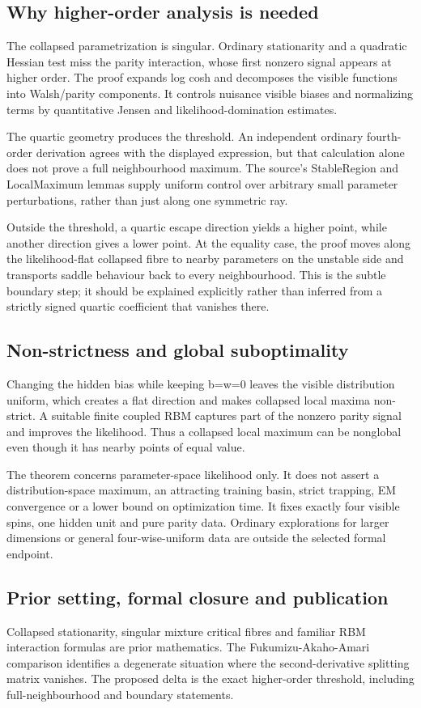 \documentclass[11pt,a4paper]{article}
\begin{document}
\subsection{Why higher-order analysis is needed}
The collapsed parametrization is singular. Ordinary stationarity and a quadratic Hessian test miss the parity interaction, whose first nonzero signal appears at higher order. The proof expands log cosh and decomposes the visible functions into Walsh/parity components. It controls nuisance visible biases and normalizing terms by quantitative Jensen and likelihood-domination estimates.

The quartic geometry produces the threshold. An independent ordinary fourth-order derivation agrees with the displayed expression, but that calculation alone does not prove a full neighbourhood maximum. The source's StableRegion and LocalMaximum lemmas supply uniform control over arbitrary small parameter perturbations, rather than just along one symmetric ray.

Outside the threshold, a quartic escape direction yields a higher point, while another direction gives a lower point. At the equality case, the proof moves along the likelihood-flat collapsed fibre to nearby parameters on the unstable side and transports saddle behaviour back to every neighbourhood. This is the subtle boundary step; it should be explained explicitly rather than inferred from a strictly signed quartic coefficient that vanishes there.

\subsection{Non-strictness and global suboptimality}
Changing the hidden bias while keeping b=w=0 leaves the visible distribution uniform, which creates a flat direction and makes collapsed local maxima non-strict. A suitable finite coupled RBM captures part of the nonzero parity signal and improves the likelihood. Thus a collapsed local maximum can be nonglobal even though it has nearby points of equal value.

The theorem concerns parameter-space likelihood only. It does not assert a distribution-space maximum, an attracting training basin, strict trapping, EM convergence or a lower bound on optimization time. It fixes exactly four visible spins, one hidden unit and pure parity data. Ordinary explorations for larger dimensions or general four-wise-uniform data are outside the selected formal endpoint.

\subsection{Prior setting, formal closure and publication}
Collapsed stationarity, singular mixture critical fibres and familiar RBM interaction formulas are prior mathematics. The Fukumizu-Akaho-Amari comparison identifies a degenerate situation where the second-derivative splitting matrix vanishes. The proposed delta is the exact higher-order threshold, including full-neighbourhood and boundary statements.
\end{document}
